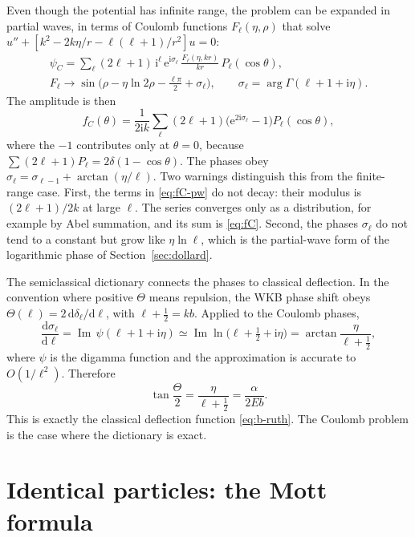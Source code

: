 \documentclass[11pt,a4paper]{book}
\numberwithin{equation}{chapter}
\newcommand{\dd}{\mathrm{d}}
\newcommand{\ii}{\mathrm{i}}
\newcommand{\ee}{\mathrm{e}}
\newcommand{\Imag}{\operatorname{Im}}
\begin{document}
Even though the potential has infinite range, the problem can be expanded in
partial waves, in terms of Coulomb functions $F_\ell(\eta,\rho)$ that solve
$u''+[k^2-2k\eta/r-\ell(\ell+1)/r^2]u=0$:
\begin{equation}\label{eq:cwaves}
  \begin{gathered}
  \psi_C=\sum_\ell(2\ell+1)\,\ii^\ell\,\ee^{\ii\sigma_\ell}\,
  \frac{F_\ell(\eta,kr)}{kr}\,P_\ell(\cos\theta),\\[4pt]
  F_\ell\to\sin\!\bigl(\rho-\eta\ln2\rho-\tfrac{\ell\pi}{2}+\sigma_\ell\bigr),
  \qquad \sigma_\ell=\arg\Gamma(\ell+1+\ii\eta).
  \end{gathered}
\end{equation}
The amplitude is then
\begin{equation}\label{eq:fC-pw}
  f_C(\theta)=\frac1{2\ii k}\sum_\ell(2\ell+1)
  \bigl(\ee^{2\ii\sigma_\ell}-1\bigr)P_\ell(\cos\theta),
\end{equation}
where the $-1$ contributes only at $\theta=0$, because
$\sum(2\ell+1)P_\ell=2\delta(1-\cos\theta)$. The phases obey
$\sigma_\ell=\sigma_{\ell-1}+\arctan(\eta/\ell)$. Two warnings distinguish this
from the finite-range case. First, the terms in \eqref{eq:fC-pw} do not decay:
their modulus is $(2\ell+1)/2k$ at large $\ell$. The series converges only as a
distribution, for example by Abel summation, and its sum is \eqref{eq:fC}.
Second, the phases $\sigma_\ell$ do not tend to a constant but grow like
$\eta\ln\ell$, which is the partial-wave form of the logarithmic phase of
Section~\ref{sec:dollard}.

The semiclassical dictionary connects the phases to classical deflection. In
the convention where positive $\Theta$ means repulsion, the WKB phase shift
obeys $\Theta(\ell)=2\,\dd\delta_\ell/\dd\ell$, with $\ell+\tfrac12=kb$. Applied
to the Coulomb phases,
\[
  \frac{\dd\sigma_\ell}{\dd\ell}=\Imag\,\psi(\ell+1+\ii\eta)
  \simeq\Imag\ln\bigl(\ell+\tfrac12+\ii\eta\bigr)
  =\arctan\frac{\eta}{\ell+\tfrac12},
\]
where $\psi$ is the digamma function and the approximation is accurate to
$O(1/\ell^2)$. Therefore
\begin{equation}\label{eq:dict}
  \tan\frac\Theta2=\frac{\eta}{\ell+\tfrac12}=\frac{\alpha}{2Eb}.
\end{equation}
This is exactly the classical deflection function \eqref{eq:b-ruth}. The
Coulomb problem is the case where the dictionary is exact.

\section{Identical particles: the Mott formula}\label{sec:mott}
\end{document}
